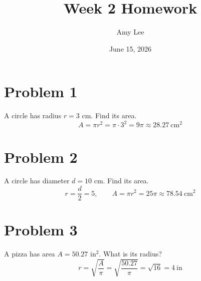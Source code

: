 \documentclass[12pt]{article}
\title{Week 2 Homework}
\author{Amy Lee}
\date{June 15, 2026}
\begin{document}
\maketitle

\section*{Problem 1}
A circle has radius $r = 3$ cm. Find its area.
\[ A = \pi r^2 = \pi \cdot 3^2 = 9\pi \approx 28.27 \ \mathrm{cm}^2 \]

\section*{Problem 2}
A circle has diameter $d = 10$ cm. Find its area.
\[ r = \frac{d}{2} = 5, \qquad A = \pi r^2 = 25\pi \approx 78.54 \ \mathrm{cm}^2 \]

\section*{Problem 3}
A pizza has area $A = 50.27$ in$^2$. What is its radius?
\[ r = \sqrt{\frac{A}{\pi}} = \sqrt{\frac{50.27}{\pi}} = \sqrt{16} = 4 \ \mathrm{in} \]
\end{document}
